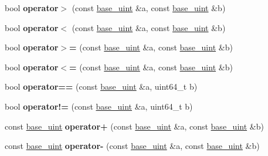 \begin{DoxyCompactItemize}
bool {\bfseries operator$>$} (const \mbox{\hyperlink{classbase__uint}{base\+\_\+uint}} \&a, const \mbox{\hyperlink{classbase__uint}{base\+\_\+uint}} \&b)
\item 
\mbox{\label{classbase__uint_a89272b5112f90ba683c0f066ba1426c1}} 
bool {\bfseries operator$<$} (const \mbox{\hyperlink{classbase__uint}{base\+\_\+uint}} \&a, const \mbox{\hyperlink{classbase__uint}{base\+\_\+uint}} \&b)
\item 
\mbox{\label{classbase__uint_a9eb243df5a6dfa3d0cd326427d99bfa6}} 
bool {\bfseries operator$>$=} (const \mbox{\hyperlink{classbase__uint}{base\+\_\+uint}} \&a, const \mbox{\hyperlink{classbase__uint}{base\+\_\+uint}} \&b)
\item 
\mbox{\label{classbase__uint_ac7f1bdba7208bd852f7b00f7c49624f8}} 
bool {\bfseries operator$<$=} (const \mbox{\hyperlink{classbase__uint}{base\+\_\+uint}} \&a, const \mbox{\hyperlink{classbase__uint}{base\+\_\+uint}} \&b)
\item 
\mbox{\label{classbase__uint_a977dbbe7e78bbdcc2aea2dc16292d424}} 
bool {\bfseries operator==} (const \mbox{\hyperlink{classbase__uint}{base\+\_\+uint}} \&a, uint64\+\_\+t b)
\item 
\mbox{\label{classbase__uint_ab7b366cc0883f25fa57fb09d4bc33807}} 
bool {\bfseries operator!=} (const \mbox{\hyperlink{classbase__uint}{base\+\_\+uint}} \&a, uint64\+\_\+t b)
\item 
\mbox{\label{classbase__uint_ab46abc7a4c02bbbe6ee4d44db58f36fd}} 
const \mbox{\hyperlink{classbase__uint}{base\+\_\+uint}} {\bfseries operator+} (const \mbox{\hyperlink{classbase__uint}{base\+\_\+uint}} \&a, const \mbox{\hyperlink{classbase__uint}{base\+\_\+uint}} \&b)
\item 
\mbox{\label{classbase__uint_a42603f675219a79c1087da39677dd6d3}} 
const \mbox{\hyperlink{classbase__uint}{base\+\_\+uint}} {\bfseries operator-\/} (const \mbox{\hyperlink{classbase__uint}{base\+\_\+uint}} \&a, const \mbox{\hyperlink{classbase__uint}{base\+\_\+uint}} \&b)
\item 
\mbox{\label{classbase__uint_a7cc93af608b4d2b8e45f8a18bb085cf0}} 

\end{DoxyCompactItemize}
